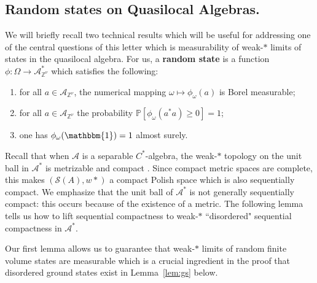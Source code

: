 \documentclass{article}
\newcommand{\one}{\mathbbm{1}}
\newcommand{\Znu}{\mathbb{Z}^\nu}
\newcommand{\A}{\mathcal{A}}
\renewcommand{\P}{\mathbb{P}}
\newcommand{\<}{\langle}
\renewcommand{\>}{\rangle}
\theoremstyle{definition}
\numberwithin{equation}{section}
\begin{document}
\subsection{Random states on Quasilocal Algebras.}
We will briefly recall two technical results which will be useful for addressing one of the central questions of this letter which is measurability of weak-$\ast$ limits of states in the quasilocal algebra. For us, a \textbf{random state} is a function $\phi:\Omega \to \A_{\Znu}^*$ which satisfies the following: 
\begin{enumerate}
    \item for all $a\in \A_{\Znu}$, the numerical mapping $\omega \mapsto \phi_\omega(a)$ is Borel measurable;
    \item for all $a\in \A_{\Znu}$ the probability $\P[\phi_\omega(a^*a) \ge 0] =1$;
    \item one has $\phi_\omega(\one) =1$ almost surely. 
\end{enumerate} 
Recall that when $\A$ is a separable $C^*$-algebra, the weak-$\ast$ topology  on the unit ball in $\A^*$  is metrizable \cite[Theorem 3.16]{Rudin} and compact \cite[Theorem V.3.1]{Conway_FA}. Since compact metric spaces are complete, this makes $(\mathcal{S}(A), w*)$ a compact Polish space which is also sequentially compact. We emphasize that the unit ball of $\A^*$ is not generally sequentially compact: this occurs because of the existence of a metric. The following lemma tells us how to lift sequential compactness to weak-$\ast$ ``disordered" sequential compactness in $\A^*$.

Our first lemma allows us to guarantee that weak-$\ast$ limits of random finite volume states are measurable which is a crucial ingredient in the proof that disordered ground states exist in Lemma~\ref{lem:gs} below. 
\end{document}
